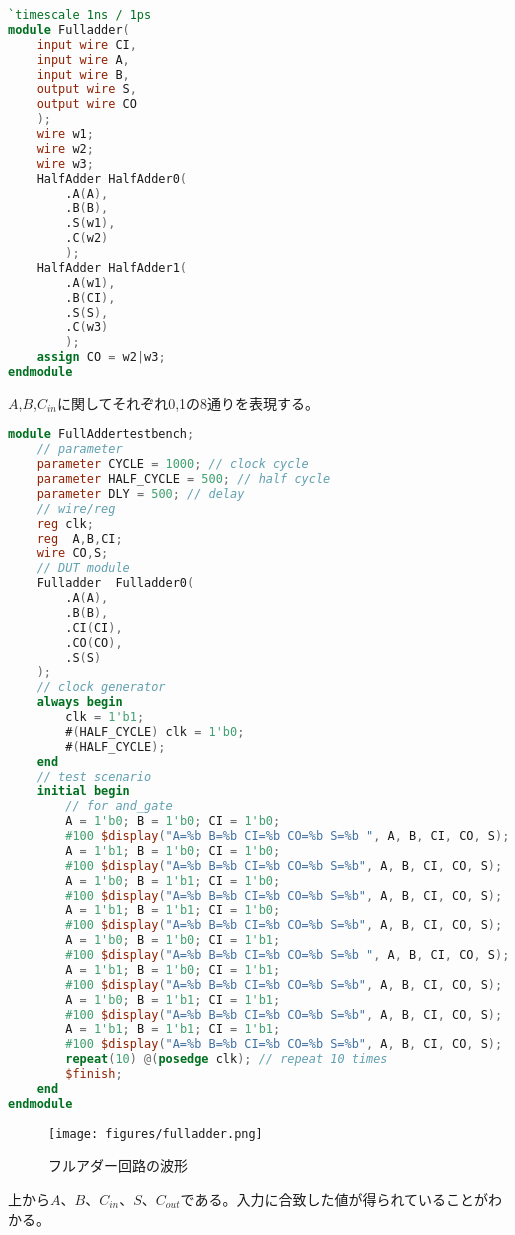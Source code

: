\documentclass[titlepage]{ltjsarticle}
\begin{document}
\begin{lstlisting}[caption=フルアダーデザイン,language=verilog]
`timescale 1ns / 1ps
module Fulladder(
    input wire CI,
    input wire A,
    input wire B,
    output wire S,
    output wire CO
    );
    wire w1;
    wire w2;
    wire w3;
    HalfAdder HalfAdder0(
        .A(A),
        .B(B),
        .S(w1),
        .C(w2)
        );
    HalfAdder HalfAdder1(
        .A(w1),
        .B(CI),
        .S(S),
        .C(w3)
        );
    assign CO = w2|w3;
endmodule
\end{lstlisting}
$A$,$B$,$C_{in}$に関してそれぞれ0,1の8通りを表現する。
\begin{lstlisting}[caption=フルアダーテストベンチ,language=verilog]
module FullAddertestbench;
    // parameter
    parameter CYCLE = 1000; // clock cycle
    parameter HALF_CYCLE = 500; // half cycle
    parameter DLY = 500; // delay
    // wire/reg
    reg clk;
    reg  A,B,CI;
    wire CO,S;
    // DUT module
    Fulladder  Fulladder0(
        .A(A),
        .B(B),
        .CI(CI),
        .CO(CO),
        .S(S)
    );    
    // clock generator
    always begin
        clk = 1'b1;
        #(HALF_CYCLE) clk = 1'b0;
        #(HALF_CYCLE);
    end
    // test scenario
    initial begin
        // for and_gate
        A = 1'b0; B = 1'b0; CI = 1'b0;
        #100 $display("A=%b B=%b CI=%b CO=%b S=%b ", A, B, CI, CO, S);
        A = 1'b1; B = 1'b0; CI = 1'b0;
        #100 $display("A=%b B=%b CI=%b CO=%b S=%b", A, B, CI, CO, S); 
        A = 1'b0; B = 1'b1; CI = 1'b0;
        #100 $display("A=%b B=%b CI=%b CO=%b S=%b", A, B, CI, CO, S);  
        A = 1'b1; B = 1'b1; CI = 1'b0;
        #100 $display("A=%b B=%b CI=%b CO=%b S=%b", A, B, CI, CO, S);
        A = 1'b0; B = 1'b0; CI = 1'b1;
        #100 $display("A=%b B=%b CI=%b CO=%b S=%b ", A, B, CI, CO, S);
        A = 1'b1; B = 1'b0; CI = 1'b1;
        #100 $display("A=%b B=%b CI=%b CO=%b S=%b", A, B, CI, CO, S); 
        A = 1'b0; B = 1'b1; CI = 1'b1;
        #100 $display("A=%b B=%b CI=%b CO=%b S=%b", A, B, CI, CO, S);  
        A = 1'b1; B = 1'b1; CI = 1'b1;
        #100 $display("A=%b B=%b CI=%b CO=%b S=%b", A, B, CI, CO, S);
        repeat(10) @(posedge clk); // repeat 10 times
        $finish;
    end
endmodule
\end{lstlisting}
\begin{figure}[H]
    \begin{center}
        \texttt{[image: figures/fulladder.png]}
        \caption{フルアダー回路の波形}
    \end{center}
\end{figure}
上から$A$、$B$、$C_{in}$、$S$、$C_{out}$である。入力に合致した値が得られていることがわかる。
\end{document}
